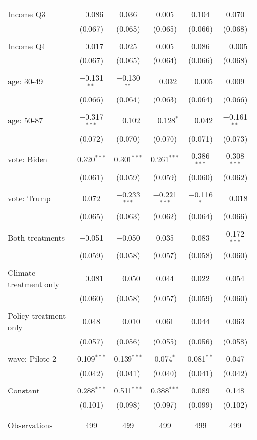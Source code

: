 \begin{tabular}{@{\extracolsep{5pt}}lccccc}
  & & & & & \\ 
 Income Q3 & $-$0.086 & 0.036 & 0.005 & 0.104 & 0.070 \\ 
  & (0.067) & (0.065) & (0.065) & (0.066) & (0.068) \\ 
  & & & & & \\ 
 Income Q4 & $-$0.017 & 0.025 & 0.005 & 0.086 & $-$0.005 \\ 
  & (0.067) & (0.065) & (0.064) & (0.066) & (0.068) \\ 
  & & & & & \\ 
 age: 30-49 & $-$0.131$^{**}$ & $-$0.130$^{**}$ & $-$0.032 & $-$0.005 & 0.009 \\ 
  & (0.066) & (0.064) & (0.063) & (0.064) & (0.066) \\ 
  & & & & & \\ 
 age: 50-87 & $-$0.317$^{***}$ & $-$0.102 & $-$0.128$^{*}$ & $-$0.042 & $-$0.161$^{**}$ \\ 
  & (0.072) & (0.070) & (0.070) & (0.071) & (0.073) \\ 
  & & & & & \\ 
 vote: Biden & 0.320$^{***}$ & 0.301$^{***}$ & 0.261$^{***}$ & 0.386$^{***}$ & 0.308$^{***}$ \\ 
  & (0.061) & (0.059) & (0.059) & (0.060) & (0.062) \\ 
  & & & & & \\ 
 vote: Trump & 0.072 & $-$0.233$^{***}$ & $-$0.221$^{***}$ & $-$0.116$^{*}$ & $-$0.018 \\ 
  & (0.065) & (0.063) & (0.062) & (0.064) & (0.066) \\ 
  & & & & & \\ 
 Both treatments & $-$0.051 & $-$0.050 & 0.035 & 0.083 & 0.172$^{***}$ \\ 
  & (0.059) & (0.058) & (0.057) & (0.058) & (0.060) \\ 
  & & & & & \\ 
 Climate treatment only & $-$0.081 & $-$0.050 & 0.044 & 0.022 & 0.054 \\ 
  & (0.060) & (0.058) & (0.057) & (0.059) & (0.060) \\ 
  & & & & & \\ 
 Policy treatment only & 0.048 & $-$0.010 & 0.061 & 0.044 & 0.063 \\ 
  & (0.057) & (0.056) & (0.055) & (0.056) & (0.058) \\ 
  & & & & & \\ 
 wave: Pilote 2 & 0.109$^{***}$ & 0.139$^{***}$ & 0.074$^{*}$ & 0.081$^{**}$ & 0.047 \\ 
  & (0.042) & (0.041) & (0.040) & (0.041) & (0.042) \\ 
  & & & & & \\ 
 Constant & 0.288$^{***}$ & 0.511$^{***}$ & 0.388$^{***}$ & 0.089 & 0.148 \\ 
  & (0.101) & (0.098) & (0.097) & (0.099) & (0.102) \\ 
  & & & & & \\ 
\hline \\[-1.8ex] 

Observations & 499 & 499 & 499 & 499 & 499 \\ 
\hline 
\hline \\[-1.8ex] 
\end{tabular} 